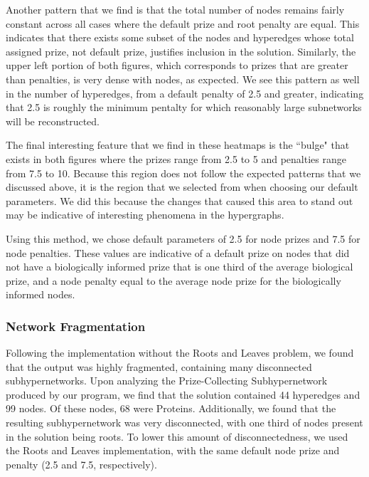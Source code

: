 \documentclass[12pt,twoside]{reedthesis}
\theoremstyle{definition}
\begin{document}
   Another pattern that we find is that the total number of nodes remains fairly constant across all cases where the default prize and root penalty are equal. This indicates that there exists some subset of the nodes and hyperedges whose total assigned prize, not default prize, justifies inclusion in the solution. Similarly, the upper left portion of both figures, which corresponds to prizes that are greater than penalties, is very dense with nodes, as expected. We see this pattern as well in the number of hyperedges, from a default penalty of 2.5 and greater, indicating that 2.5 is roughly the minimum pentalty for which reasonably large subnetworks will be reconstructed.\par

   The final interesting feature that we find in these heatmaps is the ``bulge" that exists in both figures where the prizes range from 2.5 to 5 and penalties range from 7.5 to 10. Because this region does not follow the expected patterns that we discussed above, it is the region that we selected from when choosing our default parameters. We did this because the changes that caused this area to stand out may be indicative of interesting phenomena in the hypergraphs.\par

   Using this method, we chose default parameters of 2.5 for node prizes and 7.5 for node penalties. These values are indicative of a default prize on nodes that did not have a biologically informed prize that is one third of the average biological prize, and a node penalty equal to the average node prize for the biologically informed nodes.\par

   \subsubsection{Network Fragmentation}

   Following the implementation without the Roots and Leaves problem, we found that the output was highly fragmented, containing many disconnected subhypernetworks. Upon analyzing the Prize-Collecting Subhypernetwork produced by our program, we find that the solution contained 44 hyperedges and 99 nodes. Of these nodes, 68 were Proteins. Additionally, we found that the resulting subhypernetwork was very disconnected, with one third of nodes present in the solution being roots. To lower this amount of disconnectedness, we used the Roots and Leaves implementation, with the same default node prize and penalty (2.5 and 7.5, respectively). \par
\end{document}
